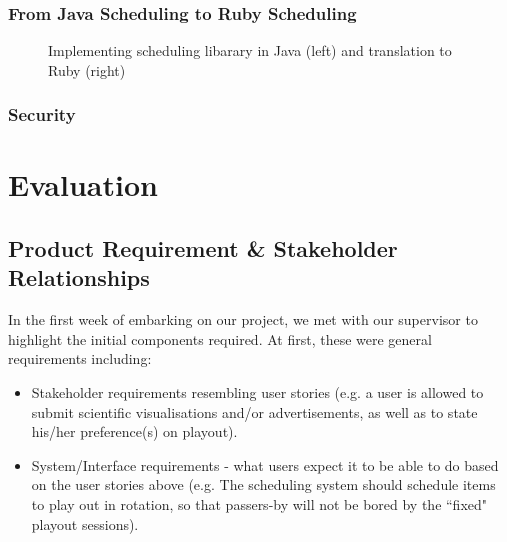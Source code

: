 \documentclass[a4paper, titlepage]{article}
\begin{document}

\subsubsection{From Java Scheduling to Ruby Scheduling}

\begin{figure}[h!]
  \begin{minipage}{0.49\textwidth}
  \end{minipage}
  \begin{minipage}{0.49\textwidth}
  \end{minipage}
    
  \caption{Implementing scheduling libarary in Java (left) and translation to Ruby (right)}
  \label{fig:impl_translation}
\end{figure}


\subsubsection{Security}



\newpage
\section{Evaluation}

\subsection{Product Requirement \& Stakeholder Relationships}

In the first week of embarking on our project, we met with our supervisor to highlight the initial components required. At first, these were general
requirements including:

\begin{itemize}

  \item Stakeholder requirements resembling user stories (e.g. a user is allowed to submit scientific visualisations and/or advertisements, as well as to state his/her preference(s) on playout).

  \item System/Interface requirements - what users expect it to be able to do based on the user stories above (e.g. The scheduling system should schedule items to play out in rotation, so that passers-by will not be bored by the ``fixed" playout sessions).
\end{itemize}
\end{document}
